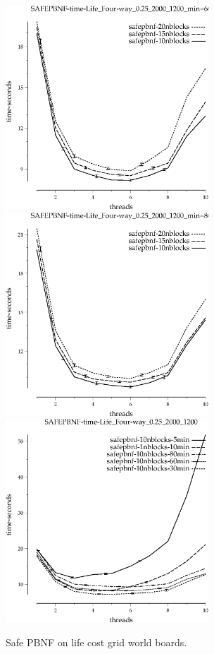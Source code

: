 \documentclass{article}
\begin{document}
\begin{appendices}
\begin{figure}[h!]
\includegraphics[width=3in]{../graphs/grid_life_four-way_0.25_2000_1200/SAFEPBNF-time-Life_Four-way_0.25_2000_1200_min=60.eps}
\includegraphics[width=3in]{../graphs/grid_life_four-way_0.25_2000_1200/SAFEPBNF-time-Life_Four-way_0.25_2000_1200_min=80.eps}
\includegraphics[width=3in]{../graphs/grid_life_four-way_0.25_2000_1200/SAFEPBNF-time-Life_Four-way_0.25_2000_1200.eps}
\caption{Safe PBNF on life cost grid world boards.}
\label{fig:SafePBNF-life}
\end{figure}


\end{appendices}
\end{document}

